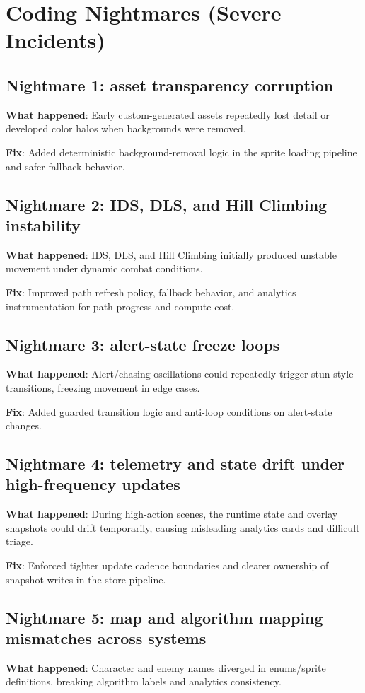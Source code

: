 \documentclass[11pt,a4paper,twoside]{article}
\begin{document}
\section{Coding Nightmares (Severe Incidents)}
\label{sec:nightmares}

\subsection{Nightmare 1: asset transparency corruption}
\textbf{What happened}: Early custom-generated assets repeatedly lost detail or developed color halos when backgrounds were removed.

\textbf{Fix}: Added deterministic background-removal logic in the sprite loading pipeline and safer fallback behavior.

\subsection{Nightmare 2: IDS, DLS, and Hill Climbing instability}
\textbf{What happened}: IDS, DLS, and Hill Climbing initially produced unstable movement under dynamic combat conditions.

\textbf{Fix}: Improved path refresh policy, fallback behavior, and analytics instrumentation for path progress and compute cost.

\subsection{Nightmare 3: alert-state freeze loops}
\textbf{What happened}: Alert/chasing oscillations could repeatedly trigger stun-style transitions, freezing movement in edge cases.

\textbf{Fix}: Added guarded transition logic and anti-loop conditions on alert-state changes.

\subsection{Nightmare 4: telemetry and state drift under high-frequency updates}
\textbf{What happened}: During high-action scenes, the runtime state and overlay snapshots could drift temporarily, causing misleading analytics cards and difficult triage.

\textbf{Fix}: Enforced tighter update cadence boundaries and clearer ownership of snapshot writes in the store pipeline.

\subsection{Nightmare 5: map and algorithm mapping mismatches across systems}
\textbf{What happened}: Character and enemy names diverged in enums/sprite definitions, breaking algorithm labels and analytics consistency.
\end{document}
